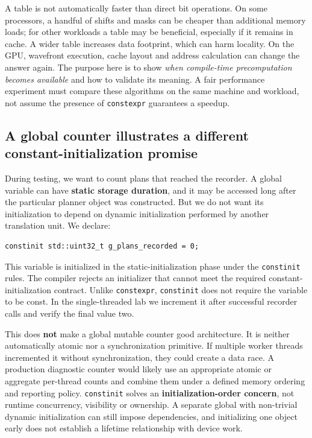 A table is not automatically faster than direct bit operations. On some processors, a handful of shifts and masks can be cheaper than additional memory loads; for other workloads a table may be beneficial, especially if it remains in cache. A wider table increases data footprint, which can harm locality. On the GPU, wavefront execution, cache layout and address calculation can change the answer again. The purpose here is to show \emph{when compile-time precomputation becomes available} and how to validate its meaning. A fair performance experiment must compare these algorithms on the same machine and workload, not assume the presence of \texttt{constexpr} guarantees a speedup.

\subsection{A global counter illustrates a different constant-initialization promise}\label{01-foundations-i-ch005-a-global-counter-illustrates-a-different-constant-initialization-promise}

During testing, we want to count plans that reached the recorder. A global variable can have \textbf{static storage duration}, and it may be accessed long after the particular planner object was constructed. But we do not want its initialization to depend on dynamic initialization performed by another translation unit. We declare:

\begin{verbatim}
constinit std::uint32_t g_plans_recorded = 0;
\end{verbatim}

This variable is initialized in the static-initialization phase under the \texttt{constinit} rules. The compiler rejects an initializer that cannot meet the required constant-initialization contract. Unlike \texttt{constexpr}, \texttt{constinit} does not require the variable to be const. In the single-threaded lab we increment it after successful recorder calls and verify the final value two.

This does \textbf{not} make a global mutable counter good architecture. It is neither automatically atomic nor a synchronization primitive. If multiple worker threads incremented it without synchronization, they could create a data race. A production diagnostic counter would likely use an appropriate atomic or aggregate per-thread counts and combine them under a defined memory ordering and reporting policy. \texttt{constinit} solves an \textbf{initialization-order concern}, not runtime concurrency, visibility or ownership. A separate global with non-trivial dynamic initialization can still impose dependencies, and initializing one object early does not establish a lifetime relationship with device work.

